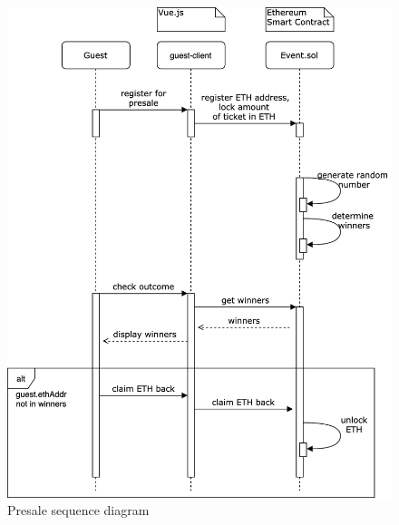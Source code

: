 \begin{figure}[H]
    \centering
    \includegraphics[width=14cm]{design/diagrams/presale.png}
    \caption{Presale sequence diagram}
    \label{fig:presale-seuquence-diagram}
\end{figure}

